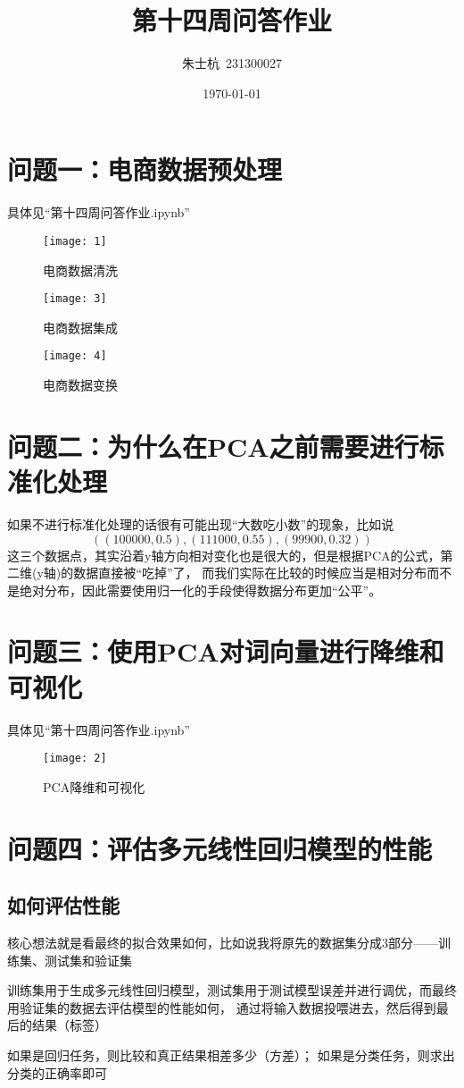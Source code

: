 \documentclass[10pt]{article}
\title{第十四周问答作业}
\author{朱士杭\ 231300027}
\date{\kaishu \today}
\begin{document}
	\maketitle
	\section{问题一：电商数据预处理}
	具体见“第十四周问答作业.ipynb”
	\begin{figure}[H]
		\centering
		\texttt{[image: 1]}
		\caption{电商数据清洗}
	\end{figure}
	\begin{figure}[H]
		\centering
		\texttt{[image: 3]}
		\caption{电商数据集成}
	\end{figure}
	\begin{figure}[H]
		\centering
		\texttt{[image: 4]}
		\caption{电商数据变换}
	\end{figure}
	
	\section{问题二：为什么在PCA之前需要进行标准化处理}
	如果不进行标准化处理的话很有可能出现“大数吃小数”的现象，比如说$$( ( 100000 , 0.5 ) , ( 111000 , 0.55 ) , ( 99900 , 0.32 ) )$$
	这三个数据点，其实沿着y轴方向相对变化也是很大的，但是根据PCA的公式，第二维(y轴)的数据直接被“吃掉”了，
	而我们实际在比较的时候应当是相对分布而不是绝对分布，因此需要使用归一化的手段使得数据分布更加“公平”。
	
	\section{问题三：使用PCA对词向量进行降维和可视化}
	具体见“第十四周问答作业.ipynb”
	\begin{figure}[H]
		\centering
		\texttt{[image: 2]}
		\caption{PCA降维和可视化}
	\end{figure}
	
	
	\section{问题四：评估多元线性回归模型的性能}
	\subsection{如何评估性能}
	核心想法就是看最终的拟合效果如何，比如说我将原先的数据集分成3部分——训练集、测试集和验证集\par
	训练集用于生成多元线性回归模型，测试集用于测试模型误差并进行调优，而最终用验证集的数据去评估模型的性能如何，
	通过将输入数据投喂进去，然后得到最后的结果（标签）\par
	如果是回归任务，则比较和真正结果相差多少（方差）；
	如果是分类任务，则求出分类的正确率即可
	
\end{document}
